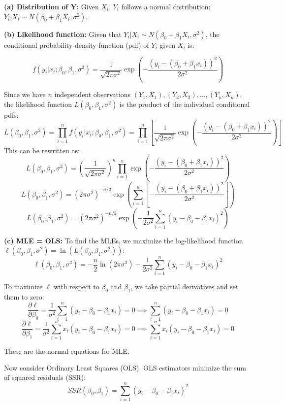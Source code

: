     \textbf{(a) Distribution of Y:} Given \(X_i\), \(Y_i\) follows a normal
distribution: \(Y_i | X_i \sim N(\beta_0 + \beta_1X_i, \sigma^2)\).

\textbf{(b) Likelihood function:} Given that
\(Y_i | X_i \sim N(\beta_0 + \beta_1X_i, \sigma^2)\), the conditional
probability density function (pdf) of \(Y_i\) given \(X_i\) is:

\[f(y_i | x_i; \beta_0, \beta_1, \sigma^2) = \frac{1}{\sqrt{2\pi\sigma^2}} \exp\left(- \frac{(y_i - (\beta_0 + \beta_1x_i))^2}{2\sigma^2}\right)\]

Since we have \(n\) independent observations
\((Y_1, X_1), (Y_2, X_2), ..., (Y_n, X_n)\), the likelihood function
\(L(\beta_0, \beta_1, \sigma^2)\) is the product of the individual
conditional pdfs:
\[L(\beta_0, \beta_1, \sigma^2) = \prod_{i=1}^{n} f(y_i | x_i; \beta_0, \beta_1, \sigma^2) = \prod_{i=1}^{n} \left[ \frac{1}{\sqrt{2\pi\sigma^2}} \exp\left(- \frac{(y_i - (\beta_0 + \beta_1x_i))^2}{2\sigma^2}\right) \right]\]
This can be rewritten as:
\[L(\beta_0, \beta_1, \sigma^2) = \left( \frac{1}{\sqrt{2\pi\sigma^2}} \right)^n \prod_{i=1}^{n} \exp\left(- \frac{(y_i - (\beta_0 + \beta_1x_i))^2}{2\sigma^2}\right)\]
\[L(\beta_0, \beta_1, \sigma^2) = (2\pi\sigma^2)^{-n/2} \exp\left(\sum_{i=1}^{n} \left[ - \frac{(y_i - (\beta_0 + \beta_1x_i))^2}{2\sigma^2} \right]\right)\]
\[L(\beta_0, \beta_1, \sigma^2) = (2\pi\sigma^2)^{-n/2} \exp\left(- \frac{1}{2\sigma^2} \sum_{i=1}^{n} (y_i - \beta_0 - \beta_1x_i)^2\right)\]

\textbf{(c) MLE = OLS:} To find the MLEs, we maximize the log-likelihood
function
\(\ell(\beta_0, \beta_1, \sigma^2) = \ln(L(\beta_0, \beta_1, \sigma^2))\):
\[\ell(\beta_0, \beta_1, \sigma^2) = - \frac{n}{2} \ln(2\pi\sigma^2) - \frac{1}{2\sigma^2} \sum_{i=1}^{n} (y_i - \beta_0 - \beta_1x_i)^2\]

To maximize \(\ell\) with respect to \(\beta_0\) and \(\beta_1\), we
take partial derivatives and set them to zero:
\[\frac{\partial\ell}{\partial\beta_0} = \frac{1}{\sigma^2} \sum_{i=1}^{n} (y_i - \beta_0 - \beta_1x_i) = 0  \implies  \sum_{i=1}^{n} (y_i - \beta_0 - \beta_1x_i) = 0\]
\[\frac{\partial\ell}{\partial\beta_1} = \frac{1}{\sigma^2} \sum_{i=1}^{n} x_i (y_i - \beta_0 - \beta_1x_i) = 0  \implies  \sum_{i=1}^{n} x_i (y_i - \beta_0 - \beta_1x_i) = 0\]

These are the normal equations for MLE.

Now consider Ordinary Least Squares (OLS). OLS estimators minimize the
sum of squared residuals (SSR):
\[SSR(\beta_0, \beta_1) = \sum_{i=1}^{n} (y_i - \beta_0 - \beta_1x_i)^2\]

